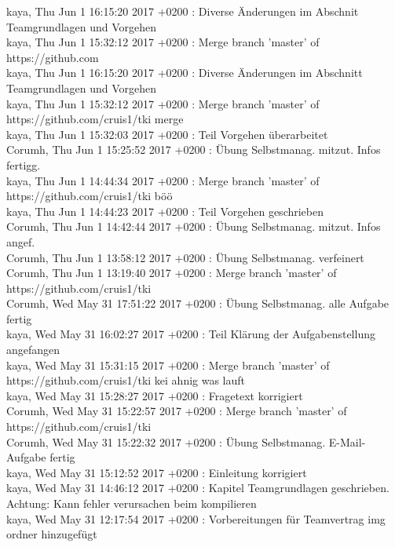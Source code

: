 
kaya, Thu Jun 1 16:15:20 2017 +0200 : Diverse Änderungen im Abschnit Teamgrundlagen und Vorgehen\\
kaya, Thu Jun 1 15:32:12 2017 +0200 : Merge branch 'master' of https://github.com\\
kaya, Thu Jun 1 16:15:20 2017 +0200 : Diverse Änderungen im Abschnitt Teamgrundlagen und Vorgehen\\
kaya, Thu Jun 1 15:32:12 2017 +0200 : Merge branch 'master' of https://github.com/cruis1/tki merge\\
kaya, Thu Jun 1 15:32:03 2017 +0200 : Teil Vorgehen überarbeitet\\
Corumh, Thu Jun 1 15:25:52 2017 +0200 : Übung Selbstmanag. mitzut. Infos fertigg.\\
kaya, Thu Jun 1 14:44:34 2017 +0200 : Merge branch 'master' of https://github.com/cruis1/tki böö\\
kaya, Thu Jun 1 14:44:23 2017 +0200 : Teil Vorgehen geschrieben\\
Corumh, Thu Jun 1 14:42:44 2017 +0200 : Übung Selbstmanag. mitzut. Infos angef.\\
Corumh, Thu Jun 1 13:58:12 2017 +0200 : Übung Selbstmanag. verfeinert\\
Corumh, Thu Jun 1 13:19:40 2017 +0200 : Merge branch 'master' of https://github.com/cruis1/tki\\
Corumh, Wed May 31 17:51:22 2017 +0200 : Übung Selbstmanag. alle Aufgabe fertig\\
kaya, Wed May 31 16:02:27 2017 +0200 : Teil Klärung der Aufgabenstellung angefangen\\
kaya, Wed May 31 15:31:15 2017 +0200 : Merge branch 'master' of https://github.com/cruis1/tki kei ahnig was lauft\\
kaya, Wed May 31 15:28:27 2017 +0200 : Fragetext korrigiert\\
Corumh, Wed May 31 15:22:57 2017 +0200 : Merge branch 'master' of https://github.com/cruis1/tki\\
Corumh, Wed May 31 15:22:32 2017 +0200 : Übung Selbstmanag. E-Mail-Aufgabe fertig\\
kaya, Wed May 31 15:12:52 2017 +0200 : Einleitung korrigiert\\
kaya, Wed May 31 14:46:12 2017 +0200 : Kapitel Teamgrundlagen geschrieben. Achtung: Kann fehler verursachen beim kompilieren\\
kaya, Wed May 31 12:17:54 2017 +0200 : Vorbereitungen für Teamvertrag img ordner hinzugefügt\\
